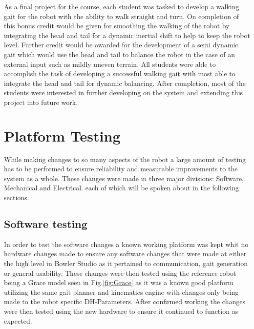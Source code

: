 \documentclass[12pt]{report}
\begin{document}
As a final project for the course, each student was tasked to develop a walking gait for the robot  with the ability to walk straight and turn. On completion of this bonus credit would be given for smoothing the walking of the robot by integrating the head and tail for a dynamic inertial shift to help to keep the robot level. Further credit would be awarded for the development of a semi dynamic gait which would use the head and tail to balance the robot in the case of an external input such as mildly uneven terrain. All students were able to accomplish the task of developing a successful walking gait with most able to integrate the head and tail for dynamic balancing. After completion, most of the students were interested in further developing on the system and extending this project into future work.
\section{Platform Testing}
    While making changes to so many aspects of the robot a large amount of testing has to be performed to ensure reliability and measurable improvements to the system as a whole. These changes were made in three major divisions: Software, Mechanical and Electrical. each of which will be spoken about in the following sections.
    \subsection{Software testing}
        In order to test the software changes a known working platform was kept whit no hardware changes made to ensure any software changes that were made at either the high level in Bowler Studio as it pertained to communication, gait generation or general usability. These changes were then tested using the reference robot being a Grace model seen in Fig.\ref{fig:Grace} as it was a known good platform utilizing the same gait planner and kinematics engine with changes only being made to the robot specific DH-Parameters. After confirmed working the changes were then tested using the new hardware to ensure it continued to function as expected.
\end{document}
